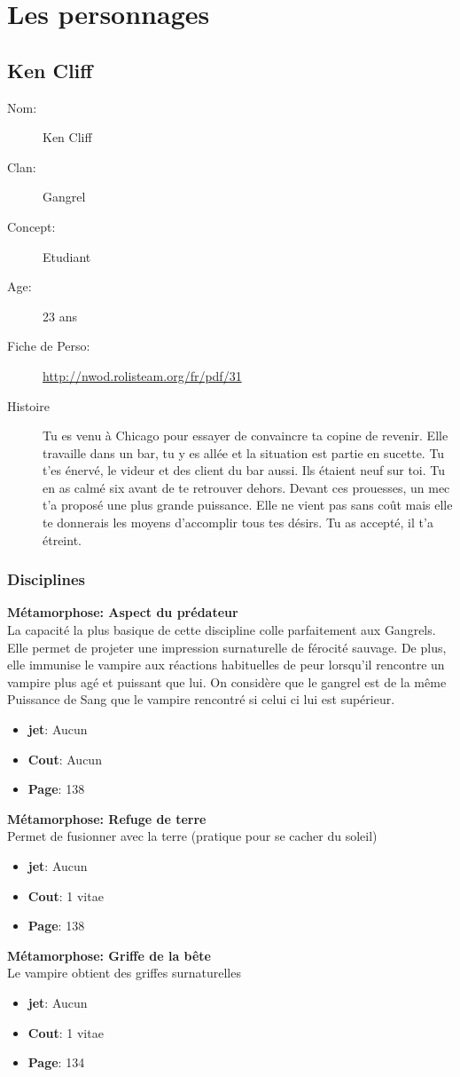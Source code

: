 \documentclass[oneside,12pt]{book}
\newcommand\don[5]{
\textbf{#1} \\
#2
\begin{itemize}
\item{ \textbf{jet}: #3}
\item{ \textbf{Cout}: #4}
\item{ \textbf{Page}: #5}
\end{itemize}
\vspace{0.5cm}
}
\begin{document}
\chapter{Les personnages}
\begin{flushleft}
\clearpage
\section{Ken Cliff}
\begin{description}
\item[Nom:]{Ken Cliff}
\item[Clan:]{Gangrel}
\item[Concept:]{Etudiant}
\item[Age:]{23 ans}
\item[Fiche de Perso:]{\url{http://nwod.rolisteam.org/fr/pdf/31}}
\item[Histoire]{
Tu es venu à Chicago pour essayer de convaincre ta copine de revenir. Elle travaille dans un bar, tu y es allée et la situation est partie en sucette. Tu t'es énervé, le videur et des client du bar aussi. Ils étaient neuf sur toi. Tu en as calmé six avant de te retrouver dehors. Devant ces prouesses, un mec t'a proposé une plus grande puissance. Elle ne vient pas sans coût mais elle te donnerais les moyens d'accomplir tous tes désirs. Tu as accepté, il t'a étreint. 
}
\end{description}


\vspace{0.5cm}
\subsection{Disciplines}
\vspace{0.5cm}
\don{Métamorphose: Aspect du prédateur}{La capacité la plus basique de cette discipline colle parfaitement aux Gangrels. Elle permet de projeter une impression surnaturelle de férocité sauvage. De plus, elle immunise le vampire aux réactions habituelles de peur lorsqu'il rencontre un vampire plus agé et puissant que lui. On considère que le gangrel est de la même Puissance de Sang que le vampire rencontré si celui ci lui est supérieur.}{Aucun}{Aucun}{138}
\don{Métamorphose: Refuge de terre}{Permet de fusionner avec la terre (pratique pour se cacher du soleil)}{Aucun}{1 vitae}{138}
\don{Métamorphose: Griffe de la bête}{Le vampire obtient des griffes surnaturelles}{Aucun}{1 vitae}{134 }


\clearpage


\end{flushleft}
\end{document}
